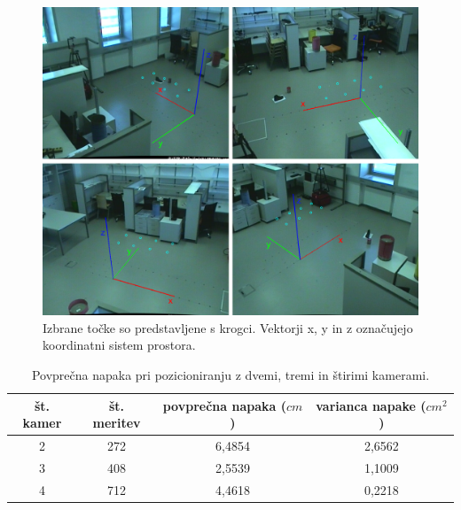 \documentclass[a4paper, 12pt]{book}
\begin{document}
\begin{figure}
\centering
\includegraphics[width=\textwidth,height=\textheight,keepaspectratio]{accuracy_points.png}
\caption{Izbrane točke so predstavljene s krogci. Vektorji x, y in z označujejo koordinatni sistem prostora.}
\label{accuracy_points}
\end{figure}

\begin{table}
\centering
\begin{tabular}{| c | c | c | c |}
\hline
št. kamer & št. meritev & povprečna napaka ($cm$) & varianca napake ($cm^2$)  \\
\hline
2 & 272 & 6,4854 & 2,6562 \\
3 & 408 & 2,5539 & 1,1009 \\
4 & 712 & 4,4618 & 0,2218 \\
\hline
\end{tabular}
\caption{Povprečna napaka pri pozicioniranju z dvemi, tremi in štirimi kamerami.}
\label{positionerrortable}
\end{table}
\end{document}
